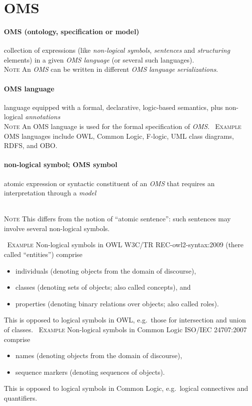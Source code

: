 \documentclass[10pt,%
\ifpretendfinal
final%
\else
draft%
\fi,
]{scrreprt}
\newcommand*{\termref}[1]{\textit{#1}}
\newcommand*{\synonym}{; }
\newcommand{\sclause}[1]{\section{#1}}
\newcommand{\termdefinition}[2]{\paragraph{#1} #2}
\newcommand{\nisref}[1]{#1}
\newenvironment{definitions}[0]{\medskip }{}
\newenvironment{note}[0]{\ \\ \textsc{Note} \quad}{}
\newenvironment{example}[0]{\ \newline \textsc{Example}\quad }{}
\begin{document}
\sclause{OMS}

\begin{definitions}

\termdefinition{OMS (ontology, specification or model)}
{collection of expressions (like \termref{non-logical symbols}, \termref{sentences} and \termref{structuring} elements) in a given \termref{OMS language} (or several such languages).}
\begin{note}
	An \termref{OMS} can be written in different \termref{OMS language} \termref{serializations}.
\end{note}	

  \termdefinition{OMS language}{language equipped with a formal, declarative, logic-based semantics, plus non-logical \termref{annotations}}
  \begin{note}
  An OMS language is used for the formal specification of \termref{OMS}.
  \end{note}
  \begin{example}
    OMS languages include OWL, Common Logic, F-logic, UML class diagrams, RDFS, and OBO.
  \end{example}


  \termdefinition{non-logical symbol\synonym OMS symbol}{atomic expression or syntactic constituent of an \termref{OMS} that requires an interpretation through a \termref{model}}

  \begin{note}
  This differs from the notion of ``atomic sentence'': such sentences
  may involve several non-logical symbols.
  \end{note}

  \begin{example}
    Non-logical symbols in OWL \nisref{W3C/TR REC-owl2-syntax:2009} (there called ``entities'') comprise
    \begin{itemize}
    \item individuals (denoting objects from the domain of discourse),
    \item classes (denoting sets of objects; also called concepts), and
    \item properties (denoting binary relations over objects; also called
      roles).
    \end{itemize}
    This is opposed to logical symbols in OWL, e.g.\ those for intersection
    and union of classes.
  \end{example}
  \begin{example}
    Non-logical symbols in Common Logic \nisref{ISO/IEC 24707:2007} comprise
    \begin{itemize}
    \item names (denoting objects from the domain of discourse),
    \item sequence markers (denoting sequences of objects).
    \end{itemize}
    This is opposed to logical symbols in Common Logic, e.g.\ logical connectives and
    quantifiers.
  \end{example}



\end{definitions}
\end{document}
